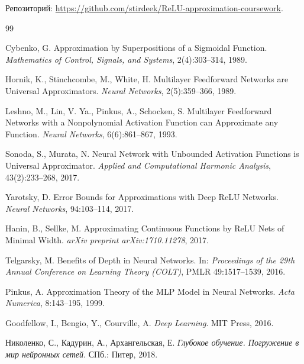 \documentclass[12pt]{article}
\begin{document}
    Репозиторий: \url{https://github.com/stirdeek/ReLU-approximation-coursework}.
	\newpage
	\begin{thebibliography}{99}
		
		Cybenko, G.
		\newblock Approximation by Superpositions of a Sigmoidal Function.
		\newblock \textit{Mathematics of Control, Signals, and Systems}, 2(4):303--314, 1989.
		
		Hornik, K., Stinchcombe, M., White, H.
		\newblock Multilayer Feedforward Networks are Universal Approximators.
		\newblock \textit{Neural Networks}, 2(5):359--366, 1989.
		
		Leshno, M., Lin, V. Ya., Pinkus, A., Schocken, S.
		\newblock Multilayer Feedforward Networks with a Nonpolynomial Activation Function can Approximate any Function.
		\newblock \textit{Neural Networks}, 6(6):861--867, 1993.
		
		Sonoda, S., Murata, N.
		\newblock Neural Network with Unbounded Activation Functions is Universal Approximator.
		\newblock \textit{Applied and Computational Harmonic Analysis}, 43(2):233--268, 2017.
		
		Yarotsky, D.
		\newblock Error Bounds for Approximations with Deep ReLU Networks.
		\newblock \textit{Neural Networks}, 94:103--114, 2017.
		
		Hanin, B., Sellke, M.
		\newblock Approximating Continuous Functions by ReLU Nets of Minimal Width.
		\newblock \textit{arXiv preprint arXiv:1710.11278}, 2017.
		
		Telgarsky, M.
		\newblock Benefits of Depth in Neural Networks.
		\newblock In: \textit{Proceedings of the 29th Annual Conference on Learning Theory (COLT)}, PMLR 49:1517--1539, 2016.
		
		Pinkus, A.
		\newblock Approximation Theory of the MLP Model in Neural Networks.
		\newblock \textit{Acta Numerica}, 8:143--195, 1999.
		
		Goodfellow, I., Bengio, Y., Courville, A.
		\newblock \textit{Deep Learning}.
		\newblock MIT Press, 2016.
		
		Николенко, С., Кадурин, А., Архангельская, Е.
		\newblock \textit{Глубокое обучение. Погружение в мир нейронных сетей}.
		\newblock СПб.: Питер, 2018.
		
	\end{thebibliography}
	
	
\end{document}
